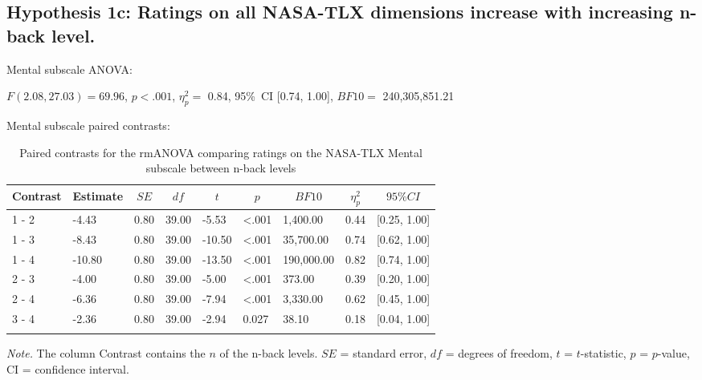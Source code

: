 \documentclass[
  man,floatsintext]{apa6}
\begin{document}
\newpage

\hypertarget{hypothesis-1c-ratings-on-all-nasa-tlx-dimensions-increase-with-increasing-n-back-level.}{%
\subsection{Hypothesis 1c: Ratings on all NASA-TLX dimensions increase with increasing n-back level.}\label{hypothesis-1c-ratings-on-all-nasa-tlx-dimensions-increase-with-increasing-n-back-level.}}

Mental subscale ANOVA:

\(F(2.08, 27.03) = 69.96\), \(p < .001\), \(\eta_{p}^{2}=\) 0.84, 95\%~CI {[}0.74, 1.00{]}, \(BF10=\) 240,305,851.21

Mental subscale paired contrasts:

\begin{table}[H]

\begin{center}
\begin{threeparttable}

\caption{\label{tab:unnamed-chunk-2}Paired contrasts for the rmANOVA comparing ratings on the NASA-TLX Mental subscale between n-back levels}

\begin{tabular}{lllllllll}
\toprule
Contrast & \multicolumn{1}{c}{Estimate} & \multicolumn{1}{c}{$SE$} & \multicolumn{1}{c}{$df$} & \multicolumn{1}{c}{$t$} & \multicolumn{1}{c}{$p$} & \multicolumn{1}{c}{$BF10$} & \multicolumn{1}{c}{$\eta_{p}^{2}$} & \multicolumn{1}{c}{$95\% CI$}\\
\midrule
1 - 2 & -4.43 & 0.80 & 39.00 & -5.53 & <.001 & 1,400.00 & 0.44 & {}[0.25, 1.00]\\
1 - 3 & -8.43 & 0.80 & 39.00 & -10.50 & <.001 & 35,700.00 & 0.74 & {}[0.62, 1.00]\\
1 - 4 & -10.80 & 0.80 & 39.00 & -13.50 & <.001 & 190,000.00 & 0.82 & {}[0.74, 1.00]\\
2 - 3 & -4.00 & 0.80 & 39.00 & -5.00 & <.001 & 373.00 & 0.39 & {}[0.20, 1.00]\\
2 - 4 & -6.36 & 0.80 & 39.00 & -7.94 & <.001 & 3,330.00 & 0.62 & {}[0.45, 1.00]\\
3 - 4 & -2.36 & 0.80 & 39.00 & -2.94 & 0.027 & 38.10 & 0.18 & {}[0.04, 1.00]\\
\bottomrule
\addlinespace
\end{tabular}

\begin{tablenotes}[para]
\normalsize{\textit{Note.} The column Contrast contains the $n$ of the n-back levels. $SE$ = standard error, $df$ = degrees of freedom, $t$ = $t$-statistic, $p$ = $p$-value, CI = confidence interval.}
\end{tablenotes}

\end{threeparttable}
\end{center}

\end{table}
\end{document}
